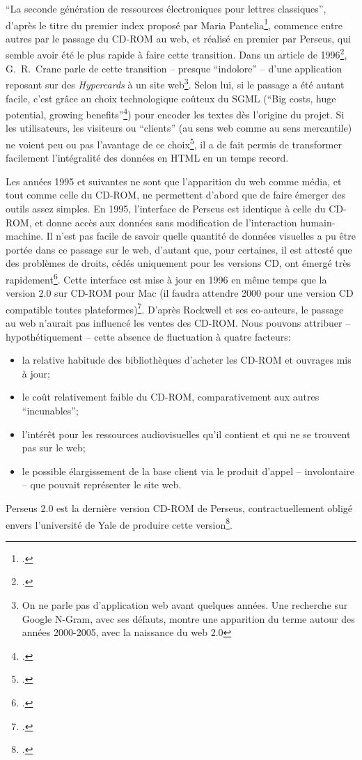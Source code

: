 \enquote{La seconde génération de ressources électroniques pour lettres classiques}, d'après le titre du premier index proposé par Maria Pantelia\footcite{pantelia_electronic_1994}, commence entre autres par le passage du CD-ROM au web, et réalisé en premier par Perseus, qui semble avoir été le plus rapide à faire cette transition. Dans un article de 1996\footcite{crane_building_1996}, G.~R.~Crane parle de cette transition -- presque \enquote{indolore} -- d'une application reposant sur des \textit{Hypercards} à un site web\footnote{On ne parle pas d'application web avant quelques années. Une recherche sur Google N-Gram, avec ses défauts, montre une apparition du terme autour des années 2000-2005, avec la naissance du web 2.0}. Selon lui, si le passage a été autant facile, c'est grâce au choix technologique coûteux du SGML (\enquote{Big costs, huge potential, growing benefits}\footcite[p. 7]{crane_building_1996}) pour encoder les textes dès l'origine du projet. Si les utilisateurs, les visiteurs ou \enquote{clients} (au sens web comme au sens mercantile) ne voient peu ou pas l'avantage de ce choix\footcite[p. 8]{crane_building_1996}, il a de fait permis de transformer facilement l'intégralité des données en HTML en un temps record.

Les années 1995 et suivantes ne sont que l'apparition du web comme média, et tout comme celle du CD-ROM, ne permettent d'abord que de faire émerger des outils assez simples. En 1995, l'interface de Perseus est identique à celle du CD-ROM, et donne accès aux données sans modification de l'interaction humain-machine. Il n'est pas facile de savoir quelle quantité de données visuelles a pu être portée dans ce passage sur le web, d'autant que, pour certaines, il est attesté que des problèmes de droits, cédés uniquement pour les versions CD, ont émergé très rapidement\footcite[p.~3]{crane_building_1996}. Cette interface est mise à jour en 1996 en même temps que la version 2.0 sur CD-ROM pour Mac (il faudra attendre 2000 pour une version CD compatible toutes plateformes)\footcite[p.~109]{rockwell_interface_2020}. D'après Rockwell et ses co-auteurs, le passage au web n'aurait pas influencé les ventes des CD-ROM. Nous pouvons attribuer -- hypothétiquement -- cette absence de fluctuation à quatre facteurs:
\begin{itemize}
    \item la relative habitude des bibliothèques d'acheter les CD-ROM et ouvrages mis à jour;
    \item le coût relativement faible du CD-ROM, comparativement aux autres \enquote{incunables};
    \item l'intérêt pour les ressources audiovisuelles qu'il contient et qui ne se trouvent pas sur le web;
    \item le possible élargissement de la base client via le produit d'appel -- involontaire -- que pouvait représenter le site web.
\end{itemize}
Perseus 2.0 est la dernière version CD-ROM de Perseus, contractuellement obligé envers l'université de Yale de produire cette version\footcite[p.~3]{crane_building_1996}. 

